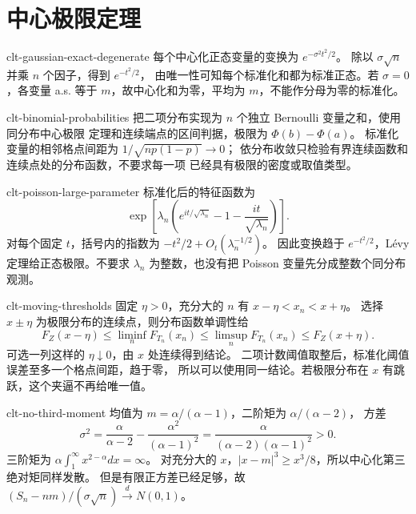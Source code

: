 \chapter{中心极限定理}

\begin{solution}{clt-gaussian-exact-degenerate}
每个中心化正态变量的变换为 $e^{-\sigma^2t^2/2}$。
除以 $\sigma\sqrt n$ 并乘 $n$ 个因子，得到 $e^{-t^2/2}$，
由唯一性可知每个标准化和都为标准正态。若 $\sigma=0$，各变量 a.s.
等于 $m$，故中心化和为零，平均为 $m$，不能作分母为零的标准化。
\end{solution}

\begin{solution}{clt-binomial-probabilities}
把二项分布实现为 $n$ 个独立 Bernoulli 变量之和，使用同分布中心极限
定理和连续端点的区间判据，极限为 $\Phi(b)-\Phi(a)$。
标准化变量的相邻格点间距为 $1/\sqrt{np(1-p)}\to0$；
依分布收敛只检验有界连续函数和连续点处的分布函数，不要求每一项
已经具有极限的密度或取值类型。
\end{solution}

\begin{solution}{clt-poisson-large-parameter}
标准化后的特征函数为
\[
 \exp\left[\lambda_n\left(e^{it/\sqrt{\lambda_n}}-1
                         -\frac{it}{\sqrt{\lambda_n}}\right)\right].
\]
对每个固定 $t$，括号内的指数为 $-t^2/2+O_t(\lambda_n^{-1/2})$。
因此变换趋于 $e^{-t^2/2}$，Lévy 定理给正态极限。不要求 $\lambda_n$
为整数，也没有把 Poisson 变量先分成整数个同分布观测。
\end{solution}

\begin{solution}{clt-moving-thresholds}
固定 $\eta>0$，充分大的 $n$ 有 $x-\eta<x_n<x+\eta$。
选择 $x\pm\eta$ 为极限分布的连续点，则分布函数单调性给
\[
 F_Z(x-\eta)\le\liminf_n F_{T_n}(x_n)
 \le\limsup_n F_{T_n}(x_n)\le F_Z(x+\eta).
\]
可选一列这样的 $\eta\downarrow0$，由 $x$ 处连续得到结论。
二项计数阈值取整后，标准化阈值误差至多一个格点间距，趋于零，
所以可以使用同一结论。若极限分布在 $x$ 有跳跃，这个夹逼不再给唯一值。
\end{solution}

\begin{solution}{clt-no-third-moment}
均值为 $m=\alpha/(\alpha-1)$，二阶矩为 $\alpha/(\alpha-2)$，
方差
\[
 \sigma^2=\frac{\alpha}{\alpha-2}
       -\frac{\alpha^2}{(\alpha-1)^2}
       =\frac{\alpha}{(\alpha-2)(\alpha-1)^2}>0.
\]
三阶矩为 $\alpha\int_1^\infty x^{2-\alpha}dx=\infty$。
对充分大的 $x$，$|x-m|^3\ge x^3/8$，所以中心化第三绝对矩同样发散。
但是有限正方差已经足够，故 $(S_n-nm)/(\sigma\sqrt n)\xrightarrow dN(0,1)$。
\end{solution}

